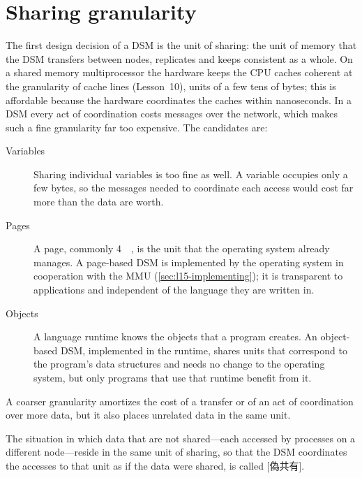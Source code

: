 \documentclass[../main.tex]{subfiles}
\begin{document}
\section{Sharing granularity}
\label{sec:l15-granularity}

The first design decision of a DSM is the unit of sharing: the unit of
memory that the DSM transfers between nodes, replicates and keeps
consistent as a whole.  On a shared memory
multiprocessor the hardware keeps the CPU caches coherent at the
granularity of cache lines (Lesson~10), units of a
few tens of bytes; this is affordable because the hardware coordinates the
caches within nanoseconds.  In a DSM every act of coordination costs
messages over the network, which makes such a fine granularity far too
expensive.  The candidates are:
\begin{description}
  \item[Variables] Sharing individual variables is too fine as well.  A
    variable occupies only a few bytes, so the messages needed to
    coordinate each access would cost far more than the data are worth.
  \item[Pages] A page, commonly \SI{4}{\kibi\byte}, is the unit that the
    operating system already manages.  A page-based DSM
    is implemented by the operating system in cooperation with the MMU
    (\cref{sec:l15-implementing}); it is transparent to applications and
    independent of the language they are written in.
  \item[Objects] A language runtime knows the objects that a program
    creates.  An object-based DSM, implemented in the runtime, shares units
    that correspond to the program's data structures and needs no change
    to the operating system, but only programs that use that runtime
    benefit from it.
\end{description}

A coarser granularity amortizes the cost of a transfer or of an act of
coordination over more data, but it also places unrelated data in the same
unit.

\begin{definition}
  The situation in which data that are not shared---each accessed by
  processes on a different node---reside in the same unit of sharing, so
  that the DSM coordinates the accesses to that unit as if the data were
  shared, is called [偽共有].
\end{definition}
\end{document}
